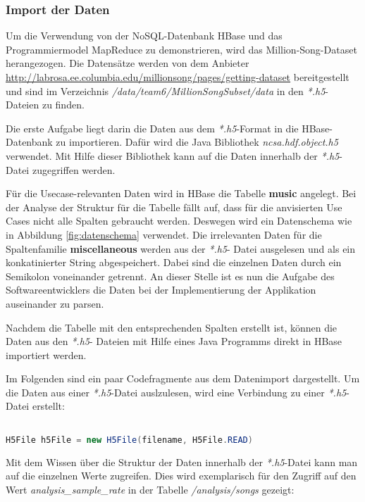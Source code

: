 \subsubsection{Import der Daten}
Um die Verwendung von der NoSQL-Datenbank HBase und das Programmiermodel MapReduce zu demonstrieren, wird das Million-Song-Dataset herangezogen. Die Datensätze werden von dem Anbieter \url{http://labrosa.ee.columbia.edu/millionsong/pages/getting-dataset} bereitgestellt und  sind im Verzeichnis \textit{/data/team6/MillionSongSubset/data} in den \textit{*.h5}-Dateien zu finden. 

Die erste Aufgabe liegt darin die Daten aus dem \textit{*.h5}-Format in die HBase-Datenbank zu importieren.
Dafür wird die Java Bibliothek \textit{ncsa.hdf.object.h5} verwendet. Mit Hilfe dieser Bibliothek kann auf die Daten innerhalb der \textit{*.h5}-Datei zugegriffen werden.

Für die Usecase-relevanten Daten wird in HBase die Tabelle \textbf{music} angelegt. Bei der Analyse der Struktur für die Tabelle fällt auf, dass für die anvisierten Use Cases nicht alle Spalten gebraucht werden. Deswegen wird ein Datenschema wie in Abbildung \ref{fig:datenschema} verwendet. Die irrelevanten Daten für die Spaltenfamilie \textbf{miscellaneous} werden aus der \textit{*.h5}- Datei ausgelesen und als ein konkatinierter String abgespeichert. Dabei sind die einzelnen Daten durch ein Semikolon voneinander getrennt. An dieser Stelle ist es nun die Aufgabe des Softwareentwicklers die Daten bei der Implementierung der Applikation auseinander zu parsen.

Nachdem die Tabelle mit den entsprechenden Spalten erstellt ist, können die Daten aus den \textit{*.h5}- Dateien mit Hilfe eines Java Programms direkt in HBase importiert werden.

Im Folgenden sind ein paar Codefragmente aus dem Datenimport dargestellt.
Um die Daten aus einer \textit{*.h5}-Datei auslzulesen, wird eine Verbindung zu einer \textit{*.h5}-Datei erstellt:



\begin{lstlisting}[language=Java]%[caption={fgdfgfd}, label=mapreduce:dgdgs]

H5File h5File = new H5File(filename, H5File.READ)
\end{lstlisting}
Mit dem Wissen über die Struktur der Daten innerhalb der \textit{*.h5}-Datei kann man auf die einzelnen Werte zugreifen. Dies wird exemplarisch für den Zugriff auf den Wert \textit{analysis\_sample\_rate} in der Tabelle \textit{/analysis/songs} gezeigt:\\

